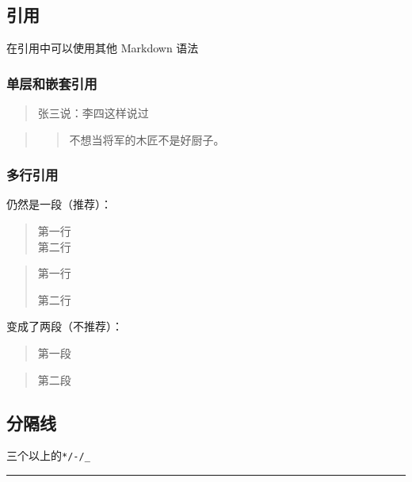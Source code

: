 \documentclass[]{article}
\begin{document}
\hypertarget{section-7}{%
\subsection{引用}\label{section-7}}

在引用中可以使用其他 Markdown 语法

\hypertarget{section-8}{%
\subsubsection{单层和嵌套引用}\label{section-8}}

\begin{quote}
张三说：李四这样说过
\end{quote}

\begin{quote}
\begin{quote}
不想当将军的木匠不是好厨子。
\end{quote}
\end{quote}

\hypertarget{section-9}{%
\subsubsection{多行引用}\label{section-9}}

仍然是一段（推荐）：

\begin{quote}
第一行\\
第二行
\end{quote}

\begin{quote}
第一行

第二行
\end{quote}

变成了两段（不推荐）：

\begin{quote}
第一段
\end{quote}

\begin{quote}
第二段
\end{quote}

\hypertarget{section-10}{%
\subsection{分隔线}\label{section-10}}

三个以上的\texttt{*/-/\_}

\begin{center}\rule{0.5\linewidth}{\linethickness}\end{center}
\end{document}
